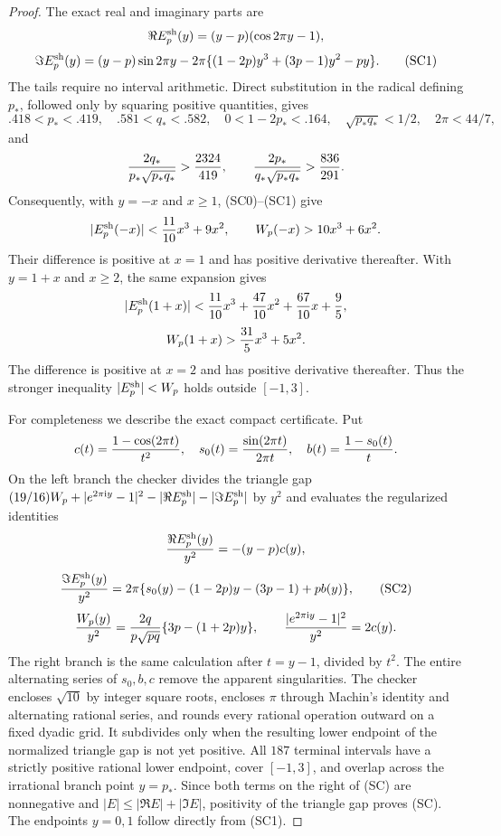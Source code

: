 \documentclass[11pt,a4paper]{article}
\numberwithin{equation}{section}
\theoremstyle{definition}
\theoremstyle{remark}
\newcommand{\ii}{\mathrm i}
\begin{document}
\begin{proof}
The exact real and imaginary parts are
\[
 \Re E_p^{\rm sh}(y)=(y-p)(\cos2\pi y-1),
\]
\[
 \Im E_p^{\rm sh}(y)=(y-p)\sin2\pi y
 -2\pi\{(1-2p)y^3+(3p-1)y^2-py\}.                    \tag{SC1}
\]
The tails require no interval arithmetic.  Direct substitution in the
radical defining $p_*$, followed only by squaring positive quantities,
gives
\[
 .418<p_*<.419,\quad .581<q_*<.582,\quad
 0<1-2p_*<.164,\quad \sqrt{p_*q_*}<1/2,
 \quad 2\pi<44/7,
\]
and
\[
 {2q_*\over p_*\sqrt{p_*q_*}}>{2324\over419},\qquad
 {2p_*\over q_*\sqrt{p_*q_*}}>{836\over291}.
\]
Consequently, with $y=-x$ and $x\ge1$, (SC0)--(SC1) give
\[
 |E_p^{\rm sh}(-x)|<{11\over10}x^3+9x^2,
 \qquad W_p(-x)>10x^3+6x^2.
\]
Their difference is positive at $x=1$ and has positive derivative
thereafter.  With $y=1+x$ and $x\ge2$, the same expansion gives
\[
 |E_p^{\rm sh}(1+x)|<{11\over10}x^3+{47\over10}x^2
                       +{67\over10}x+{9\over5},
\]
\[
 W_p(1+x)>{31\over5}x^3+5x^2.
\]
The difference is positive at $x=2$ and has positive derivative
thereafter.  Thus the stronger inequality $|E_p^{\rm sh}|<W_p$ holds
outside $[-1,3]$.

For completeness we describe the exact compact certificate.  Put
\[
 c(t)={1-\cos(2\pi t)\over t^2},\quad
 s_0(t)={\sin(2\pi t)\over2\pi t},\quad
 b(t)={1-s_0(t)\over t}.
\]
On the left branch the checker divides the triangle gap
$(19/16)W_p+|e^{2\pi\ii y}-1|^2-|\Re E_p^{\rm sh}|-|\Im E_p^{\rm sh}|$
by $y^2$ and evaluates the regularized identities
\[
 {\Re E_p^{\rm sh}(y)\over y^2}=-(y-p)c(y),
\]
\[
 {\Im E_p^{\rm sh}(y)\over y^2}
 =2\pi\{s_0(y)-(1-2p)y-(3p-1)+pb(y)\},               \tag{SC2}
\]
\[
 {W_p(y)\over y^2}={2q\over p\sqrt{pq}}
       \{3p-(1+2p)y\},\qquad
 {|e^{2\pi\ii y}-1|^2\over y^2}=2c(y).
\]
The right branch is the same calculation after $t=y-1$, divided by
$t^2$.  The entire alternating series of $s_0,b,c$ remove the apparent
singularities.  The checker encloses $\sqrt {10}$ by integer square roots,
encloses $\pi$ through Machin's identity and alternating rational series,
and rounds every rational operation outward on a fixed dyadic grid.  It
subdivides only when the resulting lower endpoint of the normalized
triangle gap is not yet positive.  All $187$ terminal intervals have a
strictly positive rational lower endpoint, cover $[-1,3]$, and overlap
across the irrational branch point $y=p_*$.  Since both terms on the
right of (SC) are nonnegative and $|E|\le|\Re E|+|\Im E|$, positivity of
the triangle gap proves (SC).
The endpoints $y=0,1$ follow directly from (SC1).
\end{proof}
\end{document}
